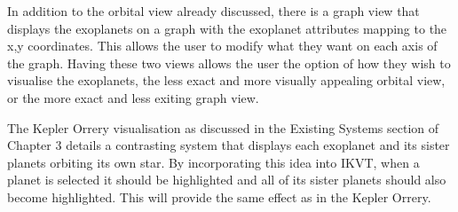 In addition to the orbital view already discussed, there is a graph view that
displays the exoplanets on a graph with the exoplanet attributes mapping to the
x,y coordinates. This allows the user to modify what they want on each axis of
the graph. Having these two views allows the user the option of how they wish to
visualise the exoplanets, the less exact and more visually appealing orbital
view, or the more exact and less exiting graph view.

The Kepler Orrery visualisation as discussed in the Existing Systems section of
Chapter 3 details a contrasting system that displays each exoplanet and its
sister planets orbiting its own star. By incorporating this idea into IKVT, when
a planet is selected it should be highlighted and all of its sister planets
should also become highlighted. This will provide the same effect as in the
Kepler Orrery.  


